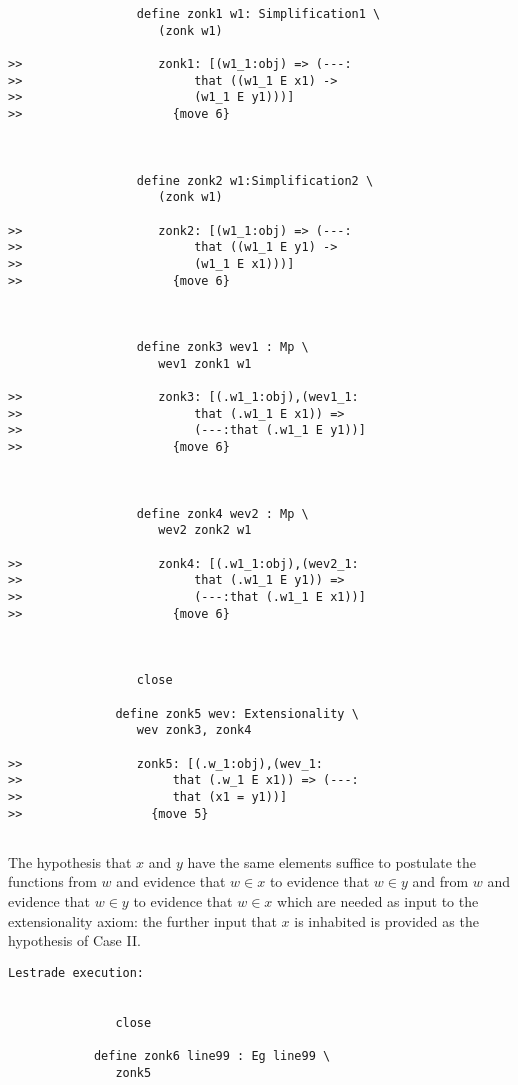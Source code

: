\documentclass{article}
\begin{document}
{\begin{verbatim}
                  define zonk1 w1: Simplification1 \
                     (zonk w1)

>>                   zonk1: [(w1_1:obj) => (---:
>>                        that ((w1_1 E x1) ->
>>                        (w1_1 E y1)))]
>>                     {move 6}



                  define zonk2 w1:Simplification2 \
                     (zonk w1)

>>                   zonk2: [(w1_1:obj) => (---:
>>                        that ((w1_1 E y1) ->
>>                        (w1_1 E x1)))]
>>                     {move 6}



                  define zonk3 wev1 : Mp \
                     wev1 zonk1 w1

>>                   zonk3: [(.w1_1:obj),(wev1_1:
>>                        that (.w1_1 E x1)) =>
>>                        (---:that (.w1_1 E y1))]
>>                     {move 6}



                  define zonk4 wev2 : Mp \
                     wev2 zonk2 w1

>>                   zonk4: [(.w1_1:obj),(wev2_1:
>>                        that (.w1_1 E y1)) =>
>>                        (---:that (.w1_1 E x1))]
>>                     {move 6}



                  close

               define zonk5 wev: Extensionality \
                  wev zonk3, zonk4

>>                zonk5: [(.w_1:obj),(wev_1:
>>                     that (.w_1 E x1)) => (---:
>>                     that (x1 = y1))]
>>                  {move 5}


\end{verbatim}


The hypothesis that $x$ and $y$ have the same elements suffice to postulate the functions from 
$w$ and evidence that $w \in x$ to evidence that $w \in y$ and from $w$ and evidence that $w \in y$ to evidence that $w \in x$ which are needed as input to the extensionality axiom:  the further input that $x$ is inhabited is provided as the hypothesis of Case II.

\begin{verbatim}Lestrade execution:


               close

            define zonk6 line99 : Eg line99 \
               zonk5


\end{verbatim}}
\end{document}

